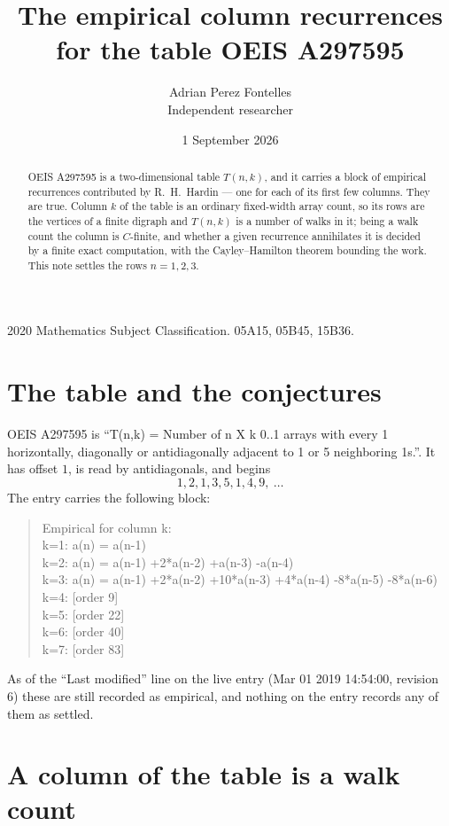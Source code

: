 \documentclass[11pt,a4paper]{article}
\title{The empirical column recurrences for the table OEIS A297595}
\author{Adrian Perez Fontelles\\ \small Independent researcher}
\date{1 September 2026}
\theoremstyle{plain}
\theoremstyle{definition}
\begin{document}
\maketitle

\begin{abstract}
OEIS A297595 is a two-dimensional table $T(n,k)$, and it carries a block of empirical
recurrences contributed by R.~H.~Hardin --- one for each of its first few columns. They are
true. Column $k$ of the table is an ordinary fixed-width array count, so its rows are the
vertices of a finite digraph and $T(n,k)$ is a number of walks in it; being a walk count the
column is $C$-finite, and whether a given recurrence annihilates it is decided by a finite
exact computation, with the Cayley--Hamilton theorem bounding the work. This note settles the rows $n=1, 2, 3$.
\end{abstract}

\noindent\small 2020 Mathematics Subject Classification. 05A15, 05B45, 15B36.\normalsize

\section{The table and the conjectures}

OEIS A297595 is ``T(n,k) = Number of n X k 0..1 arrays with every 1 horizontally, diagonally or antidiagonally adjacent to 1 or 5 neighboring 1s.''. It has offset $1$, is
read by antidiagonals, and begins
\[
1, 2, 1, 3, 5, 1, 4, 9,\ \dots
\]
The entry carries the following block:
\begin{quote}\small
Empirical for column k:\\
k=1: a(n) = a(n-1)\\
k=2: a(n) = a(n-1) +2*a(n-2) +a(n-3) -a(n-4)\\
k=3: a(n) = a(n-1) +2*a(n-2) +10*a(n-3) +4*a(n-4) -8*a(n-5) -8*a(n-6)\\
k=4: [order 9]\\
k=5: [order 22]\\
k=6: [order 40]\\
k=7: [order 83]\\
\end{quote}
As of the ``Last modified'' line on the live entry (Mar 01 2019 14:54:00, revision 6) these are still
recorded as empirical, and nothing on the entry records any of them as settled.

\section{A column of the table is a walk count}
\end{document}
